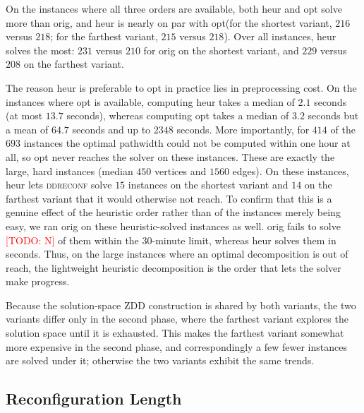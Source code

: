 \documentclass[conference]{IEEEtran}
\newcommand{\todo}[1]{\textcolor{red}{[TODO: #1]}}
\newcommand{\OrigDecom}{\textsf{orig}\xspace}
\newcommand{\HeurDecom}{\textsf{heur}\xspace}
\newcommand{\OptDecom}{\textsf{opt}\xspace}
\begin{document}
On the instances where all three orders are available, both \HeurDecom and
\OptDecom solve more than \OrigDecom, and \HeurDecom is nearly on par with
\OptDecom (for the shortest variant, $216$ versus $218$; for the farthest
variant, $215$ versus $218$).
Over all instances, \HeurDecom solves the most: $231$ versus $210$ for
\OrigDecom on the shortest variant, and $229$ versus $208$ on the farthest
variant.
 
The reason \HeurDecom is preferable to \OptDecom in practice lies in
preprocessing cost.
On the instances where \OptDecom is available, computing \HeurDecom takes a
median of $2.1$ seconds (at most $13.7$ seconds), whereas computing \OptDecom
takes a median of $3.2$ seconds but a mean of $64.7$ seconds and up to
$2348$ seconds.
More importantly, for $414$ of the $693$ instances the optimal pathwidth could
not be computed within one hour at all, so \OptDecom never reaches the solver on
these instances.
These are exactly the large, hard instances (median $450$ vertices and $1560$
edges).
On these instances, \HeurDecom lets \textsc{ddreconf} solve $15$ instances on the
shortest variant and $14$ on the farthest variant that it would otherwise not
reach.
To confirm that this is a genuine effect of the heuristic order rather than of
the instances merely being easy, we ran \OrigDecom on these heuristic-solved
instances as well.
\OrigDecom fails to solve \todo{N} of them within the $30$-minute limit, whereas
\HeurDecom solves them in seconds.
Thus, on the large instances where an optimal decomposition is out of reach, the
lightweight heuristic decomposition is the order that lets the solver make
progress.
 
Because the solution-space ZDD construction is shared by both variants, the two
variants differ only in the second phase, where the farthest variant explores the
solution space until it is exhausted.
This makes the farthest variant somewhat more expensive in the second phase, and
correspondingly a few fewer instances are solved under it; otherwise the two
variants exhibit the same trends.
 
\subsection{Reconfiguration Length}
\label{subsec:reconflength}
 
\end{document}
